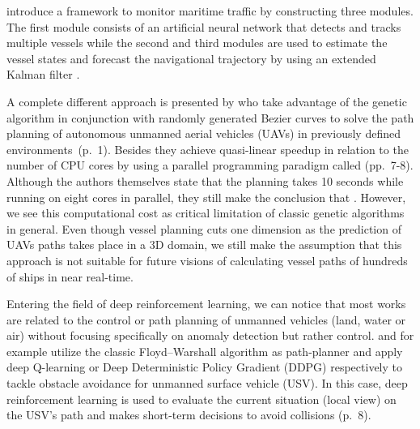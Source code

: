 \par 
\cite{perera2012maritime} introduce a framework to monitor maritime traffic by constructing three modules. The first module consists of an artificial neural network that detects and tracks multiple vessels while the second and third modules are used to estimate the vessel states and forecast the navigational trajectory by using an extended Kalman filter \cite[p.~1]{perera2012maritime}. 
\par 
A complete different approach is presented by \cite{6198334} who take advantage of the genetic algorithm in conjunction with randomly generated Bezier curves to solve the path planning of  autonomous unmanned aerial vehicles (UAVs) in previously defined environments~(p.~1). Besides they achieve quasi-linear speedup in relation to the number of CPU cores by using a parallel programming paradigm called  (pp.~7-8). Although the authors themselves state that the planning takes 10 seconds while running on eight cores in parallel, they still make the conclusion that  \cite[p.~9]{6198334}. However, we see this computational cost as critical limitation of classic genetic algorithms in general. Even though vessel planning cuts one dimension as the prediction of UAVs paths takes place in a 3D domain, we still make the assumption that this approach is not suitable for future visions of calculating vessel paths of hundreds of ships in near real-time. 
\par 
Entering the field of deep reinforcement learning, we can notice that most works are related to the control or path planning of unmanned vehicles (land, water or air) without focusing specifically on anomaly detection but rather control. \cite{etemad2020using} and \cite{zare2021continuous} for example utilize the classic Floyd–Warshall algorithm as path-planner and apply deep Q-learning or Deep Deterministic Policy Gradient (DDPG) respectively to tackle obstacle avoidance for unmanned surface vehicle (USV). In this case, deep reinforcement learning is used to evaluate the current situation (local view) on the USV's path and makes short-term decisions to avoid collisions (p.~8).

